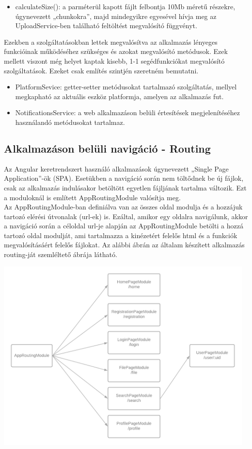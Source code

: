 \documentclass[12pt]{report}
\begin{document}
\begin{itemize}
	\item calculateSize(): a parméterül kapott fájlt felbontja 10Mb méretű részekre, úgynevezett „chunkokra”, majd mindegyikre egyesével hívja meg az UploadService-ben található feltöltést megvalósító függvényt.
\end{itemize}

Ezekben a szolgáltatásokban lettek megvalósítva az alkalmazás lényeges funkcióinak működéséhez szükséges és azokat megvalósító metódusok. Ezek mellett viszont még helyet kaptak kisebb, 1-1 segédfunkciókat megvalósító szolgáltatások. Ezeket csak említés szintjén szeretném bemutatni.

\begin{itemize}
	\item PlatformSevice: getter-setter metódusokat tartalmazó szolgáltatás, mellyel megkapható az aktuális eszköz platformja, amelyen az alkalmazás fut.
	\item NotificationsService: a web alkalmazáson belüli értesítések megjelenítéséhez használandó metódusokat tartalmaz.
\end{itemize}

\subsection{Alkalmazáson belüli navigáció - Routing}
Az Angular keretrendszert használó alkalmazások úgynevezett „Single Page Application”-ök (SPA). Esetükben a navigáció során nem töltődnek be új fájlok, csak az alkalmazás indulásakor betöltött egyetlen fájljának tartalma változik. Ezt a moduloknál is említett AppRoutingModule valósítja meg.\\
Az AppRoutingModule-ban definiálva van az összes oldal modulja és a hozzájuk tartozó elérési útvonalak (url-ek) is. Ezáltal, amikor egy oldalra navigálunk, akkor a navigáció során a céloldal url-je alapján az AppRoutingModule betölti a hozzá tartozó oldal modulját, ami tartalmazza a kinézetért felelős html és a funkciók megvalósításáért felelős fájlokat. Az alábbi ábrán az általam készített alkalmazás routing-ját szemléltető ábrája látható.

\begin{center}
	\includegraphics[width=130mm,scale=0.5,]{routing.png}
\end{center}
\end{document}
